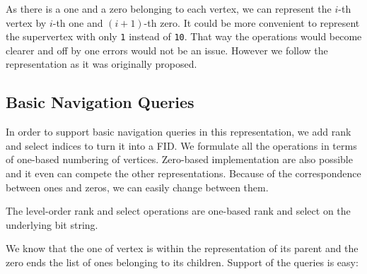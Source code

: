 As there is a one and a zero belonging to each vertex, we can represent the $i$-th vertex by $i$-th one and $(i+1)$-th zero.
It could be more convenient to represent the supervertex with only \verb|1| instead of \verb|10|.
That way the operations would become clearer and off by one errors would not be an issue.
However we follow the representation as it was originally proposed.

\subsection{Basic Navigation Queries}

In order to support basic navigation queries in this representation, we add rank and select indices to turn it into a FID.
We formulate all the operations in terms of one-based numbering of vertices.
Zero-based implementation are also possible  and it even can compete the other representations.
Because of the correspondence between ones and zeros, we can easily change between them.

\begin{algorithmic}
	\State {}
\EndFunction
\end{algorithmic}

\begin{algorithmic}
	\State {}
\EndFunction
\end{algorithmic}

The level-order rank and select operations are one-based rank and select on the underlying bit string.

We know that the one of vertex is within the representation of its parent and the zero ends the list of ones belonging to its children.
Support of the queries is easy:

\begin{algorithmic}
	\State {}
\EndFunction
\end{algorithmic}

\begin{algorithmic}
	\State {} 
\EndFunction
\end{algorithmic}

\begin{algorithmic}
		\State {}
	\Else
		\State {} 
	\EndIf
\EndFunction
\end{algorithmic}

